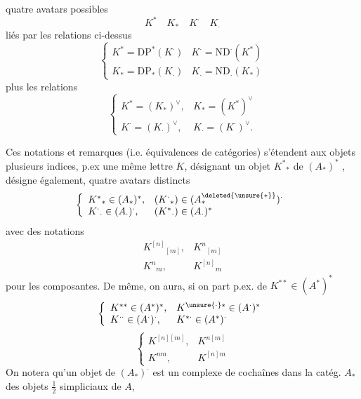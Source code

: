 quatre avatars possibles
\[
 K^*\quad K_*\quad K^{\cdot}\quad K_{\cdot}
\]
liés par les relations ci-dessus
\[
 \left\{\begin{array}{ll}
 K^*=\mathrm{DP}^*(K^{\cdot})&K^{\cdot}=\mathrm{ND}^{\cdot}(K^*)\\
 K_*=\mathrm{DP}_*(K_{\cdot})&K_{\cdot}=\mathrm{ND}_{\cdot}(K_*)
 \end{array}\right.
\]
plus les relations
\[
 \left\{\begin{array}{ll}
 K^*=(K_*)^\vee,&K_*=(K^*)^\vee\\
 K^{\cdot}=(K_{\cdot})^\vee,&K_{\cdot}=(K^{\cdot})^\vee.
 \end{array}\right.
\]

Ces  notations et remarques (i.e. équivalences de
catégories) s'étendent aux objets 
 plusieurs indices, p.ex 
une même lettre $K$, désignant 
un objet ${K^*}_*$ de $(A_*)^*$ , désigne également,
 quatre avatars distincts
\[
 \left\{\begin{array}{ll}
 {K^*}_*\in(A_*)^*,&({K^{\cdot}}_*)\in(A^{\deleted{\unsure{*}}}_*)^{\cdot}\\
 {K^{\cdot}}_{\cdot}\in(A_{\cdot})^{\cdot},&({K^*}_{\cdot})\in(A_{\cdot})^*
 \end{array}\right.
\]
avec des notations
\[
 \begin{array}{ll}
 {K^{[n]}}_{[m]},&{K^n}_{[m]}\\
 {K^n}_m,&{K^{[n]}}_m
 \end{array}
\]
pour les composantes. De même, on aura, si on part p.ex. de
$K^{**}\in(A^*)^*$
\[
 \left\{\begin{array}{ll}
 K^{**}\in(A^*)^*,&K^{\unsure{\cdot}*}\in(A^{\cdot})^*\\
 K^{\cdot\cdot}\in(A^{\cdot})^{\cdot},&K^{*\cdot}\in(A^*)^{\cdot}
 \end{array}\right.
\]
\[
 \left\{\begin{array}{ll}
 K^{[n][m]},&K^{n[m]}\\
 K^{nm},&K^{[n]m}
 \end{array}\right.
\]
On notera qu'un objet de $(A_*)^{\cdot}$ est un complexe de cochaînes
dans la catég. $A_*$ des objets $\tfrac12$ simpliciaux de $A$,

